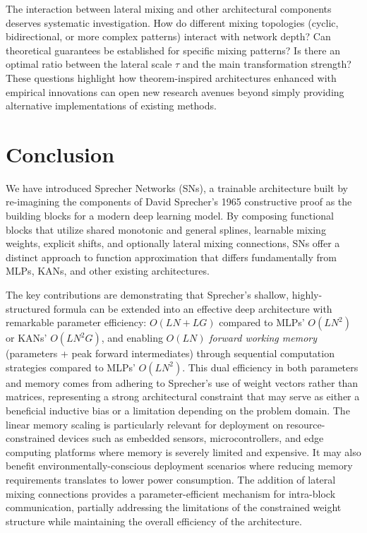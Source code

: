 \documentclass{article}
\theoremstyle{plain}
\theoremstyle{definition}
\theoremstyle{remark}
\begin{document}
The interaction between lateral mixing and other architectural components deserves systematic investigation. How do different mixing topologies (cyclic, bidirectional, or more complex patterns) interact with network depth? Can theoretical guarantees be established for specific mixing patterns? Is there an optimal ratio between the lateral scale $\tau$ and the main transformation strength? These questions highlight how theorem-inspired architectures enhanced with empirical innovations can open new research avenues beyond simply providing alternative implementations of existing methods.

\section{Conclusion}
We have introduced Sprecher Networks (SNs), a trainable architecture built by re-imagining the components of David Sprecher's 1965 constructive proof as the building blocks for a modern deep learning model. By composing functional blocks that utilize shared monotonic and general splines, learnable mixing weights, explicit shifts, and optionally lateral mixing connections, SNs offer a distinct approach to function approximation that differs fundamentally from MLPs, KANs, and other existing architectures.

The key contributions are demonstrating that Sprecher's shallow, highly-structured formula can be extended into an effective deep architecture with remarkable parameter efficiency: $O(LN + LG)$ compared to MLPs' $O(LN^2)$ or KANs' $O(LN^2G)$, and enabling $O(LN)$ \emph{forward working memory} (parameters + peak forward intermediates) through sequential computation strategies compared to MLPs' $O(LN^2)$. This dual efficiency in both parameters and memory comes from adhering to Sprecher's use of weight vectors rather than matrices, representing a strong architectural constraint that may serve as either a beneficial inductive bias or a limitation depending on the problem domain. The linear memory scaling is particularly relevant for deployment on resource-constrained devices such as embedded sensors, microcontrollers, and edge computing platforms where memory is severely limited and expensive. It may also benefit environmentally-conscious deployment scenarios where reducing memory requirements translates to lower power consumption. The addition of lateral mixing connections provides a parameter-efficient mechanism for intra-block communication, partially addressing the limitations of the constrained weight structure while maintaining the overall efficiency of the architecture.
\end{document}
